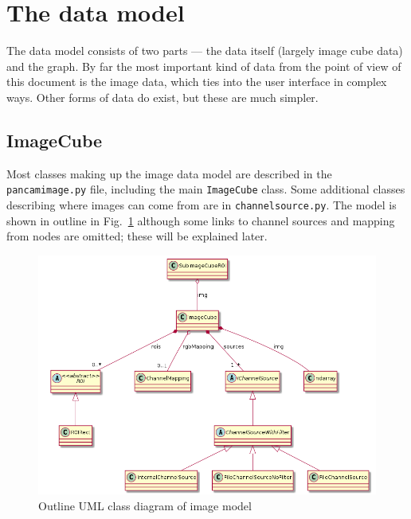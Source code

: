 

\section{The data model}
The data model consists of two parts --- the data itself (largely
image cube data) and the graph. By far the most important kind of data
from the point of view of this document is the image data, which ties
into the user interface in complex ways. Other forms of data do exist,
but these are much simpler.

\subsection{ImageCube}
Most classes making up the image data 
model are described in the \texttt{pancamimage.py} file, including the main \texttt{ImageCube}
class. Some additional classes describing where images can come from are in \texttt{channelsource.py}.
The model is shown in outline in Fig.~\ref{image.png} although some links to channel sources
and mapping from nodes are omitted; these will be explained later.

\begin{figure}[ht]
\center
\includegraphics[width=5in]{image.png}
\caption{Outline UML class diagram of image model}
\label{image.png}
\end{figure}
